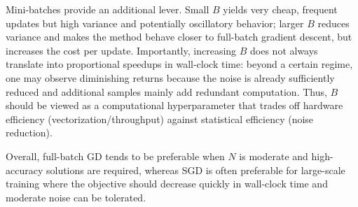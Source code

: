 Mini-batches provide an additional lever. Small $B$ yields very cheap, frequent updates but high variance and potentially oscillatory behavior; larger $B$ reduces variance and makes the method behave closer to full-batch gradient descent, but increases the cost per update.\cite{Bottou2012}
Importantly, increasing $B$ does not always translate into proportional speedups in wall-clock time: beyond a certain regime, one may observe diminishing returns because the noise is already sufficiently reduced and additional samples mainly add redundant computation.\cite{Shallue2019}
Thus, $B$ should be viewed as a computational hyperparameter that trades off hardware efficiency (vectorization/throughput) against statistical efficiency (noise reduction).\cite{Bottou2012,Shallue2019}

Overall, full-batch GD tends to be preferable when $N$ is moderate and high-accuracy solutions are required, whereas SGD is often preferable for large-scale training where the objective should decrease quickly in wall-clock time and moderate noise can be tolerated.\cite{Bottou2012,Bubeck2015}